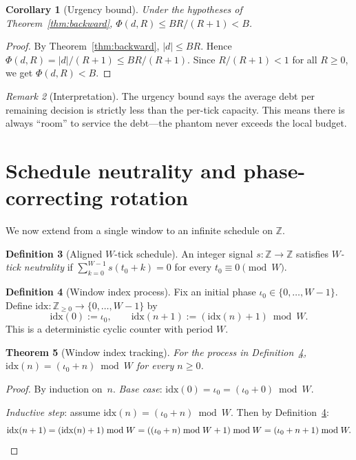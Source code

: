 \documentclass[11pt]{amsart}
\newtheorem{theorem}{Theorem}[section]
\newtheorem{corollary}[theorem]{Corollary}
\theoremstyle{definition}
\newtheorem{definition}[theorem]{Definition}
\theoremstyle{remark}
\newtheorem{remark}[theorem]{Remark}
\newcommand{\Z}{\mathbb{Z}}
\begin{document}
\begin{corollary}[Urgency bound]\label{cor:urgency}
Under the hypotheses of Theorem~\ref{thm:backward},
$\Phi(d,R)\le BR/(R+1)<B$.
\end{corollary}
\begin{proof}
By Theorem~\ref{thm:backward}, $|d|\le BR$.
Hence $\Phi(d,R)=|d|/(R+1)\le BR/(R+1)$.
Since $R/(R+1)<1$ for all $R\ge0$, we get $\Phi(d,R)<B$.
\end{proof}

\begin{remark}[Interpretation]
The urgency bound says the average debt per remaining decision is
strictly less than the per-tick capacity.  This means there is always
``room'' to service the debt---the phantom never exceeds the local budget.
\end{remark}

\section{Schedule neutrality and phase-correcting rotation}\label{sec:schedule}

We now extend from a single window to an infinite schedule on $\Z$.

\begin{definition}[Aligned $W$-tick schedule]\label{def:schedule}
An integer signal $s:\Z\to\Z$ satisfies \emph{$W$-tick neutrality} if
$\sum_{k=0}^{W-1} s(t_0+k)=0$ for every $t_0\equiv 0\pmod{W}$.
\end{definition}

\begin{definition}[Window index process]\label{def:idx}
Fix an initial phase $\iota_0\in\{0,\ldots,W{-}1\}$.
Define $\mathrm{idx}:\Z_{\ge 0}\to\{0,\ldots,W{-}1\}$ by
\[
\mathrm{idx}(0):=\iota_0,\qquad
\mathrm{idx}(n+1):=(\mathrm{idx}(n)+1)\bmod W.
\]
This is a deterministic cyclic counter with period $W$.
\end{definition}

\begin{theorem}[Window index tracking]\label{thm:index}
For the process in Definition~\ref{def:idx},
$\mathrm{idx}(n)=(\iota_0+n)\bmod W$ for every $n\ge0$.
\end{theorem}
\begin{proof}
By induction on~$n$.
\textit{Base case}: $\mathrm{idx}(0)=\iota_0=(\iota_0+0)\bmod W$. \checkmark

\textit{Inductive step}: assume $\mathrm{idx}(n)=(\iota_0+n)\bmod W$.
Then by Definition~\ref{def:idx}:
\[
\mathrm{idx}(n+1)
=(\mathrm{idx}(n)+1)\bmod W
=((\iota_0+n)\bmod W+1)\bmod W
=(\iota_0+n+1)\bmod W.
\qedhere
\]
\end{proof}
\end{document}
